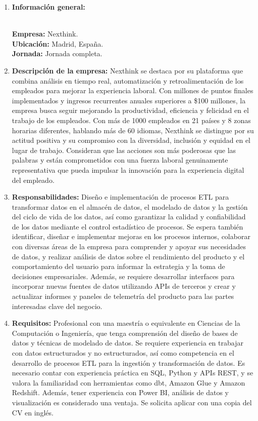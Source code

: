 \documentclass[12pt]{article}
\begin{document}
                \begin{enumerate}
                    \item \textbf{Información general:}
                    
                        \textbf{\\Empresa:} Nexthink.
                        \textbf{\\Ubicación:} Madrid, España.
                        \textbf{\\Jornada:} Jornada completa.

                    \item \textbf{Descripción de la empresa:}
                        Nexthink se destaca por su plataforma que combina análisis en tiempo real, automatización y retroalimentación de los empleados para mejorar la experiencia laboral. Con millones de puntos finales implementados y ingresos recurrentes anuales superiores a \$100 millones, la empresa busca seguir mejorando la productividad, eficiencia y felicidad en el trabajo de los empleados. Con más de 1000 empleados en 21 países y 8 zonas horarias diferentes, hablando más de 60 idiomas, Nexthink se distingue por su actitud positiva y su compromiso con la diversidad, inclusión y equidad en el lugar de trabajo. Consideran que las acciones son más poderosas que las palabras y están comprometidos con una fuerza laboral genuinamente representativa que pueda impulsar la innovación para la experiencia digital del empleado.

                    \item \textbf{Responsabilidades:}
                        Diseño e implementación de procesos ETL para transformar datos en el almacén de datos, el modelado de datos y la gestión del ciclo de vida de los datos, así como garantizar la calidad y confiabilidad de los datos mediante el control estadístico de procesos. Se espera también identificar, diseñar e implementar mejoras en los procesos internos, colaborar con diversas áreas de la empresa para comprender y apoyar sus necesidades de datos, y realizar análisis de datos sobre el rendimiento del producto y el comportamiento del usuario para informar la estrategia y la toma de decisiones empresariales. Además, se requiere desarrollar interfaces para incorporar nuevas fuentes de datos utilizando APIs de terceros y crear y actualizar informes y paneles de telemetría del producto para las partes interesadas clave del negocio.
                    
                    \item \textbf{Requisitos:}
                        Profesional con una maestría o equivalente en Ciencias de la Computación o Ingeniería, que tenga comprensión del diseño de bases de datos y técnicas de modelado de datos. Se requiere experiencia en trabajar con datos estructurados y no estructurados, así como competencia en el desarrollo de procesos ETL para la ingestión y transformación de datos. Es necesario contar con experiencia práctica en SQL, Python y APIs REST, y se valora la familiaridad con herramientas como dbt, Amazon Glue y Amazon Redshift. Además, tener experiencia con Power BI, análisis de datos y visualización es considerado una ventaja. Se solicita aplicar con una copia del CV en inglés.


\end{enumerate}
\end{document}
